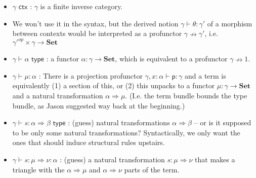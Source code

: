 \documentclass[10pt]{article}
\newcommand{\yields}{\vdash}
\newcommand{\ctx}{\,\,\mathsf{ctx}}
\newcommand{\type}{\,\,\mathsf{type}}
\newcommand\Set[0]{\ensuremath{\textbf{Set}}}
\begin{document}
\begin{itemize}
\item $\gamma \ctx$ : $\gamma$ is a finite inverse category.  

\item We won't use it in the syntax, but the derived notion $\gamma
  \yields \theta : \gamma'$ of a morphism between contexts would be
  interpreted as a profunctor $\gamma \nrightarrow \gamma'$,
  i.e. $\gamma'^{op} \times \gamma \to \Set$

\item $\gamma \yields \alpha \type$ : a functor $\alpha : \gamma \to
  \Set$, which is equivalent to a profunctor $\gamma \nrightarrow 1$.  

\item $\gamma \yields \mu : \alpha$ : There is a projection profunctor
  $\gamma,x:\alpha \yields \mathsf{p} : \gamma$ and a term is
  equivalently (1) a section of this, or (2) this unpacks to a functor
  $\mu : \gamma \to \Set$ and a natural transformation $\alpha
  \Rightarrow \mu$.  (I.e. the term bundle bounds the type bundle, as
  Jason suggested way back at the beginning.)

\item $\gamma \yields s : \alpha \Rightarrow \beta \type$ : (guess)
  natural transformations $\alpha \Rightarrow \beta$ -- or is it
  supposed to be only some natural transformations?  Syntactically, we
  only want the ones that should induce structural rules upstairs.
  
\item $\gamma \yields s : \mu \Rightarrow \nu : \alpha$ : (guess) a
  natural transformation $s : \mu \Rightarrow \nu$ that makes a triangle
  with the $\alpha \Rightarrow \mu$ and $\alpha \Rightarrow \nu$ parts
  of the term.


\end{itemize}
\end{document}
